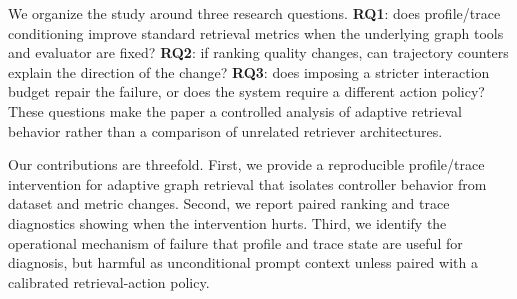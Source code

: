 We organize the study around three research questions. \textbf{RQ1}: does profile/trace conditioning improve standard retrieval metrics when the underlying graph tools and evaluator are fixed? \textbf{RQ2}: if ranking quality changes, can trajectory counters explain the direction of the change? \textbf{RQ3}: does imposing a stricter interaction budget repair the failure, or does the system require a different action policy? These questions make the paper a controlled analysis of adaptive retrieval behavior rather than a comparison of unrelated retriever architectures.

Our contributions are threefold. First, we provide a reproducible profile/trace intervention for adaptive graph retrieval that isolates controller behavior from dataset and metric changes. Second, we report paired ranking and trace diagnostics showing when the intervention hurts. Third, we identify the operational mechanism of failure that profile and trace state are useful for diagnosis, but harmful as unconditional prompt context unless paired with a calibrated retrieval-action policy.
